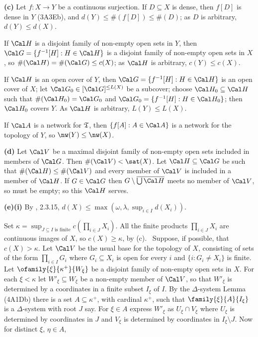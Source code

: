 {{\bf (c)} Let $f:X\to Y$ be a continuous surjection.   If $D\subseteq X$ is
dense, then $f[D]$ is
dense in $Y$ (3A3Eb), and $d(Y)\le\#(f[D])\le\#(D)$;  as $D$ is arbitrary,
$d(Y)\le d(X)$.

If $\Cal H$ is a disjoint family of non-empty open sets in $Y$, then
$\Cal G=\{f^{-1}[H]:H\in\Cal H\}$ is a disjoint family of non-empty open
sets in $X$, so $\#(\Cal H)=\#(\Cal G)\le c(X)$;  as $\Cal H$ is arbitrary,
$c(Y)\le c(X)$.

If $\Cal H$ is an open cover of $Y$, then
$\Cal G=\{f^{-1}[H]:H\in\Cal H\}$ is an open cover of $X$;  let
$\Cal G_0\in[\Cal G]^{\le L(X)}$ be a subcover;  choose
$\Cal H_0\subseteq\Cal H$ such that $\#(\Cal H_0)=\Cal G_0$ and
$\Cal G_0=\{f^{-1}[H]:H\in\Cal H_0\}$;  then $\Cal H_0$ covers $Y$.
As $\Cal H$ is arbitrary, $L(Y)\le L(X)$.

If $\Cal A$ is a network for $\frak T$, then $\{f[A]:A\in\Cal A\}$ is a
network for the topology of $Y$, so $\nw(Y)\le\nw(X)$.

\medskip

{\bf (d)} Let $\Cal V$ be a maximal disjoint family of non-empty open sets
included in members of $\Cal G$.   Then $\#(\Cal V)<\sat(X)$.   Let
$\Cal H\subseteq\Cal G$ be such that $\#(\Cal H)\le\#(\Cal V)$ and every
member of $\Cal V$ is included in a member of $\Cal H$.   If $G\in\Cal G$
then $G\setminus\overline{\bigcup\Cal H}$ meets no member of $\Cal V$, so
must be empty;  so this $\Cal H$ serves.

\medskip

{\bf (e)(i)} By \Engelking, 2.3.15,
$d(X)\le\max(\omega,\lambda,\sup_{i\in I}d(X_i))$.

\medskip

 Set
$\kappa=\sup_{J\subseteq I\text{ is finite}}c(\prod_{i\in J}X_i)$.
All the
finite products $\prod_{i\in J}X_i$ are continuous images of $X$, so
$c(X)\ge\kappa$, by (c).   \Quer\ Suppose, if possible, that
$c(X)>\kappa$.   Let $\Cal V$ be the usual base for the topology of $X$,
consisting of sets of the form $\prod_{i\in I}G_i$ where $G_i\subseteq X_i$
is open for every $i$ and $\{i:G_i\ne X_i\}$ is finite.
Let $\ofamily{\xi}{\kappa^+}{W_{\xi}}$ be a disjoint family of non-empty
open sets in $X$.   For each $\xi<\kappa$ let
$W'_{\xi}\subseteq W_{\xi}$ be a non-empty member of $\Cal V$, so that
$W'_{\xi}$ is determined by a coordinates in a finite subset $I_{\xi}$
of $I$.   By the $\Delta$-system Lemma (4A1Db) there is a set
$A\subseteq\kappa^+$, with cardinal $\kappa^+$, such that
$\family{\xi}{A}{I_{\xi}}$ is a $\Delta$-system with root $J$ say.
For $\xi\in A$ express $W'_{\xi}$ as $U_{\xi}\cap V_{\xi}$ where
$U_{\xi}$ is determined by coordinates in $J$ and $V_{\xi}$ is
determined by coordinates in $I_{\xi}\setminus J$.   Now for distinct
$\xi$, $\eta\in A$,

}
